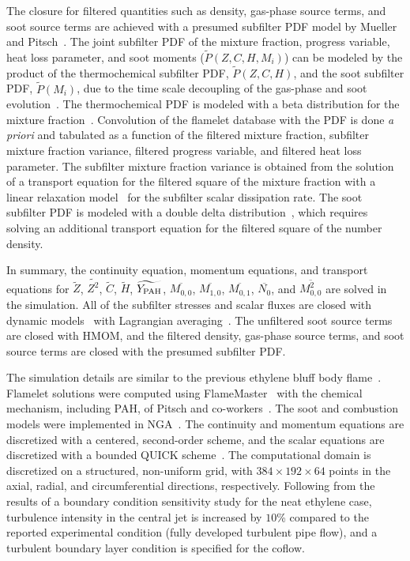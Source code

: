 \documentclass[review,3p,times]{elsarticle}
\begin{document}
The closure for filtered quantities such as density, gas-phase source terms, and soot source terms are achieved with a presumed subfilter PDF model by Mueller and Pitsch~\cite{mueller12, mueller11b}.  The joint subfilter PDF of the mixture fraction, progress variable, heat loss parameter, and soot moments ($\widetilde{P}\left(Z,C,H,M_i\right)$) can be modeled by the product of the thermochemical subfilter PDF, $\widetilde{P}\left(Z,C,H\right)$, and the soot subfilter PDF, $\widetilde{P}\left(M_i\right)$, due to the time scale decoupling of the gas-phase and soot evolution~\cite{mueller11b}.  The thermochemical PDF is modeled with a beta distribution for the mixture fraction~\cite{cook94}.  Convolution of the flamelet database with the PDF is done \emph{a priori} and tabulated as a function of the filtered mixture fraction, subfilter mixture fraction variance, filtered progress variable, and filtered heat loss parameter.  The subfilter mixture fraction variance is obtained from the solution of a transport equation for the filtered square of the mixture fraction with a linear relaxation model~\cite{ihme08b} for the subfilter scalar dissipation rate.  The soot subfilter PDF is modeled with a double delta distribution~\cite{mueller11b}, which requires solving an additional transport equation for the filtered square of the number density.

In summary, the continuity equation, momentum equations, and transport equations for $\widetilde{Z}$, $\widetilde{Z^2}$, $\widetilde{C}$, $\widetilde{H}$, $\widetilde{Y_{\rm PAH}}$, $\overline{M_{0,0}}$, $\overline{M_{1,0}}$, $\overline{M_{0,1}}$, $\overline{N_0}$, and $\overline{M^2_{0,0}}$ are solved in the simulation.  All of the subfilter stresses and scalar fluxes are closed with dynamic models~\cite{germano91} with Lagrangian averaging~\cite{meneveau96}.  The unfiltered soot source terms are closed with HMOM, and the filtered density, gas-phase source terms, and soot source terms are closed with the presumed subfilter PDF.  

The simulation details are similar to the previous ethylene bluff body flame~\cite{mueller13}.  Flamelet solutions were computed using FlameMaster~\cite{FlameMaster} with the chemical mechanism, including PAH, of Pitsch and co-workers~\cite{blanquart09b,narayanaswamy10}.  The soot and combustion models were implemented in NGA~\cite{desjardins08}.  The continuity and momentum equations are discretized with a centered, second-order scheme, and the scalar equations are discretized with a bounded QUICK scheme~\cite{herrmann06}.  The computational domain is discretized on a structured, non-uniform grid, with $384 \times 192 \times 64$ points in the axial, radial, and circumferential directions, respectively.  Following from the results of a boundary condition sensitivity study for the neat ethylene case, turbulence intensity in the central jet is increased by $10$\% compared to the reported experimental condition (fully developed turbulent pipe flow), and a turbulent boundary layer condition is specified for the coflow.  
\end{document}
